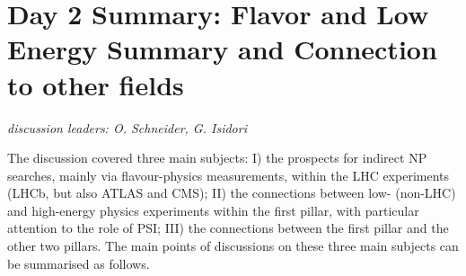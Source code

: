 \newpage
\section*{Day 2 Summary: Flavor and Low Energy Summary and Connection to other 
fields}\label{discussionconnetion}{\it discussion leaders: O. Schneider, G. Isidori}

\noindent The discussion covered three main subjects: I) the prospects for indirect NP searches, mainly via flavour-physics 
measurements, within the LHC experiments (LHCb, but also ATLAS and CMS);
II) the connections between low- (non-LHC) and high-energy physics experiments within the first pillar, with particular attention to the role of PSI;
III) the connections between the first pillar and the other two pillars.
The main points of discussions on these three main subjects can be summarised as follows.

